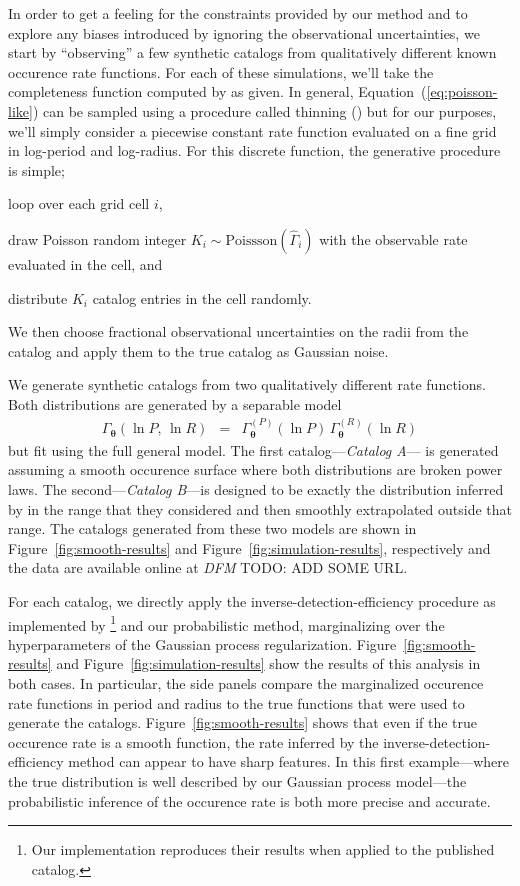 \documentclass[12pt,preprint]{aastex}
\newcommand{\Fig}[1]{Figure~\ref{fig:#1}}
\newcommand{\fig}[1]{\Fig{#1}}
\newcommand{\Eq}[1]{Equation~(\ref{eq:#1})}
\newcommand{\eq}[1]{\Eq{#1}}
\newcommand{\bvec}[1]{\ensuremath{\boldsymbol{#1}}}
\newcommand{\todo}[3]{{\color{#2} \emph{#1} TODO: #3}}
\newcommand{\dfmtodo}[1]{\todo{DFM}{red}{#1}}
\newcommand{\rate}{\ensuremath{\Gamma}}
\newcommand{\ratepar}{{\ensuremath{\theta}}}
\newcommand{\ratepars}{{\ensuremath{\bvec{\ratepar}}}}
\newcommand{\obs}[1]{\ensuremath{\hat{#1}}}
\newcommand{\radius}{\ensuremath{R}}
\newcommand{\period}{\ensuremath{P}}
\newcommand{\modela}{\emph{Catalog A}}
\newcommand{\modelb}{\emph{Catalog B}}
\begin{document}
In order to get a feeling for the constraints provided by our method and to
explore any biases introduced by ignoring the observational uncertainties, we
start by ``observing'' a few synthetic catalogs from qualitatively different
known occurence rate functions.
For each of these simulations, we'll take the completeness function computed
by \citet{petigura} as given.
In general, \eq{poisson-like} can be sampled using a procedure called thinning
(\citealt{poisson}) but for our purposes, we'll simply consider a piecewise
constant rate function evaluated on a fine grid in log-period and log-radius.
For this discrete function, the generative procedure is simple;
\begin{enumerate}
{\item loop over each grid cell $i$,}
{\item draw Poisson random integer $K_i\sim\mathrm{Poissson}(\obs{\rate}_i)$
with the observable rate evaluated in the cell, and}
{\item distribute $K_i$ catalog entries in the cell randomly.}
\end{enumerate}
We then choose fractional observational uncertainties on the radii from the
\citet{petigura} catalog and apply them to the true catalog as Gaussian noise.

We generate synthetic catalogs from two qualitatively different rate
functions.
Both distributions are generated by a separable model
\begin{eqnarray}
\rate_\ratepars (\ln\period,\,\ln\radius) &=&
    \rate_\ratepars^{(\period)}(\ln\period)\,
    \rate_\ratepars^{(\radius)}(\ln\radius)
\end{eqnarray}
but fit using the full general model.
The first catalog---\modela--- is generated assuming a smooth occurence
surface where both distributions are broken power laws.
The second---\modelb---is designed to be exactly the distribution inferred by
\citet{petigura} in the range that they considered and then smoothly
extrapolated outside that range.
The catalogs generated from these two models are shown in \fig{smooth-results}
and \fig{simulation-results}, respectively and the data are available online
at \dfmtodo{ADD SOME URL}.

For each catalog, we directly apply the inverse-detection-efficiency procedure
as implemented by \citealt{petigura}\footnote{Our implementation reproduces
their results when applied to the published catalog.} and our probabilistic
method, marginalizing over the hyperparameters of the Gaussian process
regularization.
\Fig{smooth-results} and \fig{simulation-results} show the results of this
analysis in both cases.
In particular, the side panels compare the marginalized occurence rate
functions in period and radius to the true functions that were used to
generate the catalogs.
\Fig{smooth-results} shows that even if the true occurence rate is a smooth
function, the rate inferred by the inverse-detection-efficiency method can
appear to have sharp features.
In this first example---where the true distribution is well described by our
Gaussian process model---the probabilistic inference of the occurence rate is
both more precise and accurate.
\end{document}

